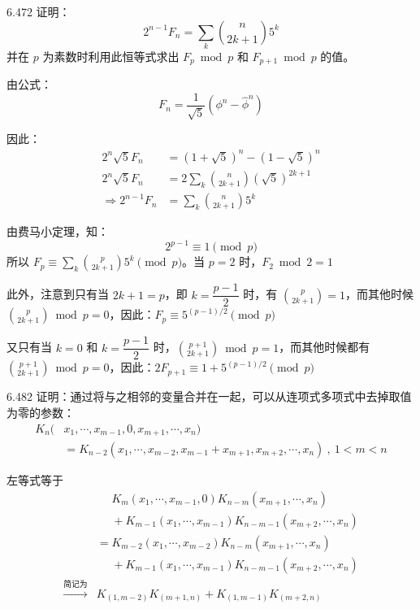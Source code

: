\begin{problem}{6.47}{2}
  证明：
  \[
    2^{n-1} F_n = \sum_k \binom{n}{2k+1} 5^k
  \]
  并在 \( p \) 为素数时利用此恒等式求出 \( F_p \bmod p \) 和 \( F_{p+1} \bmod p \) 的值。
\end{problem}

由公式：
\[
  \boxed{F_n = \dfrac{1}{\sqrt{5}} (\phi^n - \hat{\phi}^n)}
\]

因此：
\begin{align*}
  2^n \sqrt{5} F_n &= (1 + \sqrt{5})^n - (1 - \sqrt{5})^n \\
  2^n \sqrt{5} F_n &= 2 \sum_{k} \binom{n}{2k+1} (\sqrt{5})^{2k+1} \\
  \Rightarrow 2^{n-1} F_n &= \sum_{k} \binom{n}{2k+1} 5^k
\end{align*}

由费马小定理，知：
\[
  2^{p-1} \equiv 1 \pmod{p}
\]
所以 \( F_p \equiv \sum_{k} \binom{p}{2k+1} 5^k \pmod{p} \)。当 \( p = 2 \) 时，\( F_2 \bmod 2 = 1 \)

此外，注意到只有当 \( 2k+1 = p \)，即 \( k = \dfrac{p-1}{2} \) 时，有 \( \binom{p}{2k+1} = 1 \)，而其他时候 \( \binom{p}{2k+1} \bmod p = 0 \)，因此：\( F_p \equiv 5^{(p-1)/2} \pmod{p} \)

又只有当 \( k = 0 \) 和 \( k = \dfrac{p-1}{2} \) 时，\( \binom{p+1}{2k+1} \bmod p = 1 \)，而其他时候都有 \( \binom{p+1}{2k+1} \bmod p = 0 \)，因此：\( 2 F_{p+1} \equiv 1 + 5^{(p-1)/2} \pmod{p} \)

\begin{problem}{6.48}{2}
  证明：通过将与之相邻的变量合并在一起，可以从连项式多项式中去掉取值为零的参数：
  \begin{align*}
    K_n (& x_1, \cdots, x_{m-1}, 0, x_{m+1}, \cdots, x_n) \\
    &= K_{n-2} (x_1, \cdots, x_{m-2}, x_{m-1} + x_{m+1}, x_{m+2}, \cdots, x_n) \ , \ 1 < m < n
  \end{align*}
\end{problem}

左等式等于
\begin{align*}
  &\phantom{=} K_m (x_1, \cdots, x_{m-1}, 0) K_{n-m} (x_{m+1}, \cdots, x_n) \\
  &\phantom{=} + K_{m-1} (x_1, \cdots, x_{m-1}) K_{n-m-1} (x_{m+2}, \cdots, x_n) \\
  &= K_{m-2} (x_1, \cdots, x_{m-2}) K_{n-m} (x_{m+1}, \cdots, x_n) \\
  &\phantom{=} + K_{m-1}(x_1, \cdots, x_{m-1}) K_{n-m-1}(x_{m+2}, \cdots, x_n) \\
  \xrightarrow{\text{简记为}} & K_{(1, m-2)} K_{(m+1, n)} + K_{(1, m-1)} K_{(m+2, n)}
\end{align*}

